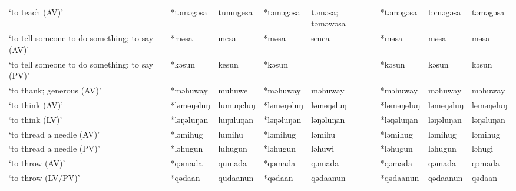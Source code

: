 \begin{landscape}
\begin{longtable}[c]{@{}p{3cm}<{\raggedright}p{2.75cm}<{\raggedright}p{2.75cm}<{\raggedright}p{2.75cm}<{\raggedright}p{2.75cm}<{\raggedright}p{2.75cm}<{\raggedright}p{2.75cm}<{\raggedright}p{2.75cm}<{\raggedright}@{}}
`to teach (AV)'                                      & *təməgəsa          & tumugesa                       & *təməgəsa          & təməsa; təməwəsa           & *təməgəsa        & təməgəsa                 & təməgəsa                          \\
`to tell someone to do something; to say (AV)'       & *məsa              & mesa                           & *məsa              & əmca                       & *məsa            & məsa                     & məsa                              \\
`to tell someone to do something; to say (PV)'       & *kəsun             & kesun                          & *kəsun             &                            & *kəsun           & kəsun                    & kəsun                             \\
`to thank; generous (AV)'                            & *məhuway           & muhuwe                         & *məhuway           & məhuway                    & *məhuway         & məhuway                  & məhuway                           \\
`to think (AV)'                                      & *ləməŋəluŋ         & lumuŋeluŋ                      & *ləməŋəluŋ         & ləməŋəluŋ                  & *ləməŋəluŋ       & ləməŋəluŋ                & ləməŋəluŋ                         \\
`to think (LV)'                                      & *ləŋəluŋan         & luŋuluŋan                      & *ləŋəluŋan         & ləŋəluŋan                  & *ləŋəluŋan       & ləŋəluŋan                & ləŋəluŋan                         \\
`to thread a needle (AV)'                            & *ləmihug           & lumihu                         & *ləmihug           & ləmihu                     & *ləmihug         & ləmihug                  & ləmihug                           \\
`to thread a needle (PV)'                            & *ləhugun           & luhugun                        & *ləhugun           & ləhuwi                     & *ləhugun         & ləhugun                  & ləhugi                            \\
`to throw (AV)'                                      & *qəmada            & qumada                         & *qəmada            & qəmada                     & *qəmada          & qəmada                   & qəmada                            \\
`to throw (LV/PV)'                                   & *qədaan            & qudaanun                       & *qədaan            & qədaanun                   & *qədaanun        & qədaanun                 & qədaan                            \\

\end{longtable}
\end{landscape}

